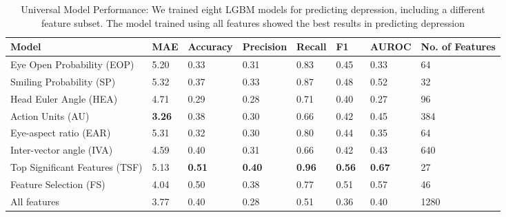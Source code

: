 \begin{table}[h]
\caption{\label{tab:results_features_lopo_lgbm} Universal Model Performance: We trained eight LGBM models for predicting depression, including a different feature subset. The model trained using all features showed the best results in predicting depression} 

\footnotesize
\centering  
    \begin{tabular}{p{3.4cm}p{1cm}p{1cm}p{1cm}p{1cm}p{1cm}p{1cm}p{1.7cm}}
    \toprule
    \textbf{Model} & \textbf{MAE} & \textbf{Accuracy} & \textbf{Precision} & \textbf{Recall} & \textbf{F1} & \textbf{AUROC} & \textbf{No. of Features} \\ 
    \midrule
    
    Eye Open Probability (EOP)  & 5.20 & 0.33\ & 0.31\ & 0.83\ & 0.45\ & 0.33\  &  64 \\
    
    Smiling Probability (SP) & 5.32 & 0.37\ & 0.33\ & 0.87\ & 0.48\ & 0.52\ & 32 \\
    
    Head Euler Angle (HEA) & 4.71 & 0.29\ & 0.28\ & 0.71\ & 0.40\ & 0.27\ & 96 \\

    Action Units (AU) & \textbf{3.26} & 0.38\ & 0.30\ & 0.66\ & 0.42\ & 0.45\ & 384 \\

    Eye-aspect ratio (EAR) & 5.31 & 0.32\ & 0.30\ & 0.80\ & 0.44\ & 0.35\ & 64 \\

    Inter-vector angle (IVA) & 4.59 & 0.40\ & 0.31\ & 0.66\ & 0.42\ & 0.43\ &  640 \\
    
    Top Significant Features (TSF) & 5.13 & \textbf{0.51}\ & \textbf{0.40}\ & \textbf{0.96}\ & \textbf{0.56}\ & \textbf{0.67}\ & 27 \\

    Feature Selection (FS) & 4.04 & 0.50\ & 0.38\ & 0.77\ & 0.51\ & 0.57\ &  46 \\
    
    All features & 3.77 & 0.40\ & 0.28\ & 0.51\ & 0.36\ & 0.40\ & 1280 \\
    
    \bottomrule
 
\end{tabular}
\end{table}

